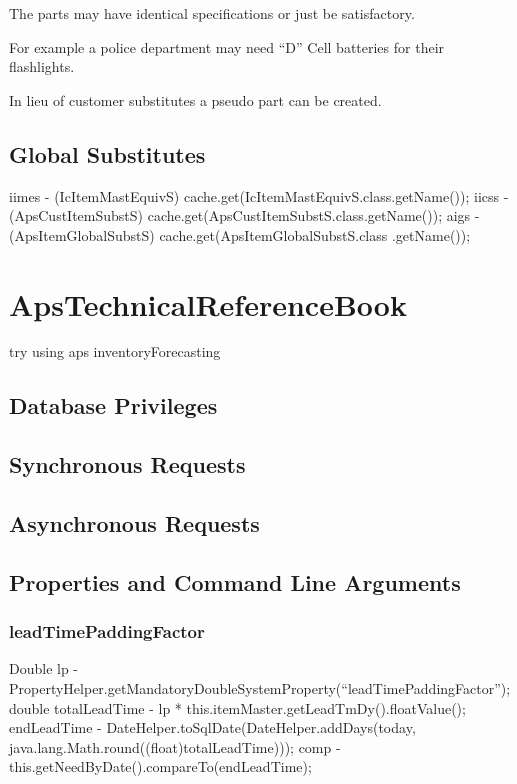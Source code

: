\documentclass[letterpaper,10pt,english]{sphinxmanual}
\begin{document}
The parts may have identical specifications or just be satisfactory.

For example a police department may need ``D'' Cell batteries for their flashlights.

In lieu of customer substitutes a pseudo part can be created.


\section{Global Substitutes}
\label{APS/ApsTechnical:global-substitutes}
iimes - (IcItemMastEquivS) cache.get(IcItemMastEquivS.class.getName());
iicss - (ApsCustItemSubstS)
cache.get(ApsCustItemSubstS.class.getName()); aigs -
(ApsItemGlobalSubstS) cache.get(ApsItemGlobalSubstS.class .getName());


\chapter{ApsTechnicalReferenceBook}
\label{APS/ApsTechnicalReferenceBook:apstechnicalreferencebook}\label{APS/ApsTechnicalReferenceBook::doc}
try using aps inventoryForecasting


\section{Database Privileges}
\label{APS/ApsTechnicalReferenceBook:database-privileges}

\section{Synchronous Requests}
\label{APS/ApsTechnicalReferenceBook:synchronous-requests}

\section{Asynchronous Requests}
\label{APS/ApsTechnicalReferenceBook:asynchronous-requests}

\section{Properties and Command Line Arguments}
\label{APS/ApsTechnicalReferenceBook:properties-and-command-line-arguments}

\subsection{leadTimePaddingFactor}
\label{APS/ApsTechnicalReferenceBook:leadtimepaddingfactor}
Double lp -
PropertyHelper.getMandatoryDoubleSystemProperty(“leadTimePaddingFactor”);
double totalLeadTime - lp * this.itemMaster.getLeadTmDy().floatValue();
endLeadTime - DateHelper.toSqlDate(DateHelper.addDays(today,
java.lang.Math.round((float)totalLeadTime))); comp -
this.getNeedByDate().compareTo(endLeadTime);
\end{document}
